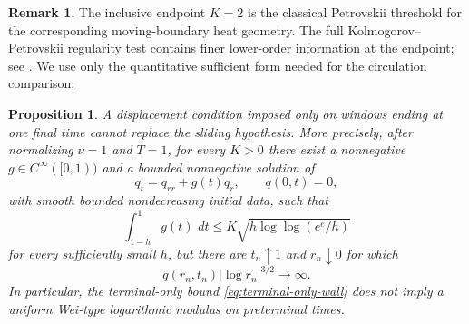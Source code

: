 \documentclass[11pt]{article}
\numberwithin{equation}{section}
\newtheorem{proposition}[proposition]{Proposition}
\theoremstyle{definition}
\newtheorem{remark}[remark]{Remark}
\newcommand{\dd}{\,d}
\begin{document}
\begin{remark}
The inclusive endpoint $K=2$ is the classical Petrovskii threshold for the corresponding moving-boundary heat geometry.  The full Kolmogorov--Petrovskii regularity test contains finer lower-order information at the endpoint; see \cite{Abdulla2005}.  We use only the quantitative sufficient form needed for the circulation comparison.
\end{remark}

\begin{proposition}\label{prop:terminal-no-go}
A displacement condition imposed only on windows ending at one final time cannot replace the sliding hypothesis.  More precisely, after normalizing $\nu=1$ and $T=1$, for every $K>0$ there exist a nonnegative $g\in C^\infty([0,1))$ and a bounded nonnegative solution of
\[
 q_t=q_{rr}+g(t)q_r,\qquad q(0,t)=0,
\]
with smooth bounded nondecreasing initial data, such that
\begin{equation}\label{eq:terminal-only-wall}
 \int_{1-h}^{1}g(t)\,\dd t
 \le K\sqrt{h\log\log(e^e/h)}
\end{equation}
for every sufficiently small $h$, but there are $t_n\uparrow1$ and $r_n\downarrow0$ for which
\begin{equation}\label{eq:terminal-no-modulus}
 q(r_n,t_n)|\log r_n|^{3/2}\longrightarrow\infty.
\end{equation}
In particular, the terminal-only bound \eqref{eq:terminal-only-wall} does not imply a uniform Wei-type logarithmic modulus on preterminal times.
\end{proposition}
\end{document}
